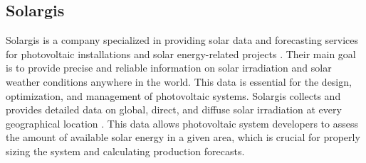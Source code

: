 \subsection{Solargis} \label{sec:solargis}
Solargis is a company specialized in providing solar data and forecasting services for photovoltaic
installations and solar energy-related projects \cite{solargis}. Their main goal is to provide precise and
reliable information on solar irradiation and solar weather conditions anywhere in the world.
This data is essential for the design, optimization, and management of photovoltaic systems.
Solargis collects and provides detailed data on global, direct, and diffuse solar irradiation at
every geographical location \cite{solargis}. This data allows photovoltaic system developers to assess the
amount of available solar energy in a given area, which is crucial for properly sizing the
system and calculating production forecasts.


